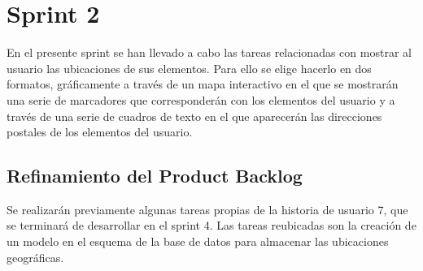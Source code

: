 \section{Sprint 2}
En el presente sprint se han llevado a cabo las tareas relacionadas con mostrar al usuario las ubicaciones de sus elementos. Para ello se elige hacerlo en dos formatos, gráficamente a través de un mapa interactivo en el que se mostrarán una serie de marcadores que corresponderán con los elementos del usuario y a través de una serie de cuadros de texto en el que aparecerán las direcciones postales de los elementos del usuario.
	\subsection{Refinamiento del Product Backlog}
	Se realizarán previamente algunas tareas propias de la historia de usuario 7, que se terminará de desarrollar en el sprint 4. Las tareas reubicadas son la creación de un modelo en el esquema de la base de datos para almacenar las ubicaciones geográficas.
	

